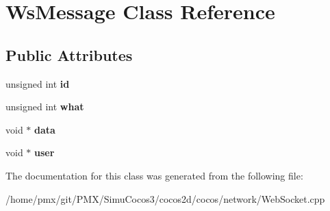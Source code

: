 \hypertarget{classWsMessage}{}\section{Ws\+Message Class Reference}
\label{classWsMessage}
\subsection*{Public Attributes}
\begin{DoxyCompactItemize}
\item 
\mbox{\label{classWsMessage_ad98b0924c78bf2b9d097f338a9b78b04}} 
unsigned int {\bfseries id}
\item 
\mbox{\label{classWsMessage_af13db2d2f74f4bc0f39745b1b9db0f47}} 
unsigned int {\bfseries what}
\item 
\mbox{\label{classWsMessage_af2c42b2c5c111e004cd85dc823e021a2}} 
void $\ast$ {\bfseries data}
\item 
\mbox{\label{classWsMessage_ab70195cdaac0c86d6146780970665ad1}} 
void $\ast$ {\bfseries user}
\end{DoxyCompactItemize}


The documentation for this class was generated from the following file\+:\begin{DoxyCompactItemize}
\item 
/home/pmx/git/\+P\+M\+X/\+Simu\+Cocos3/cocos2d/cocos/network/Web\+Socket.\+cpp\end{DoxyCompactItemize}
